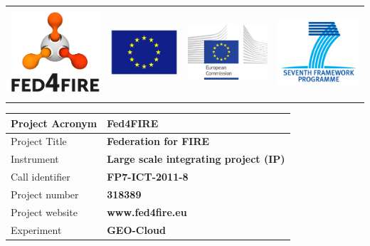 \documentclass[a4paper]{article}
\title{}
\author{Ruben Perez Pascual}
\date{2014-07-04T11:26:00Z}
\begin{document}
\begin{flushleft}
\tablehead{}
\begin{supertabular}{llll}
 &
 &
 &
\\
\end{supertabular}
\end{flushleft}

\bigskip


\bigskip

\begin{flushleft}
\tablehead{}
\begin{supertabular}{|m{1.98856in}|m{4.25246in}|}
\hline
Project Acronym &
\bfseries Fed4FIRE\\\hline
Project Title &
\bfseries Federation for FIRE\\\hline
Instrument &
\bfseries Large scale integrating project (IP)\\\hline
Call identifier &
\bfseries FP7-ICT-2011-8\\\hline
Project number &
\bfseries 318389\\\hline
Project website &
\bfseries www.fed4fire.eu\\\hline
Experiment &
\bfseries GEO-Cloud\\\hline
\end{supertabular}
\end{flushleft}
\end{document}
